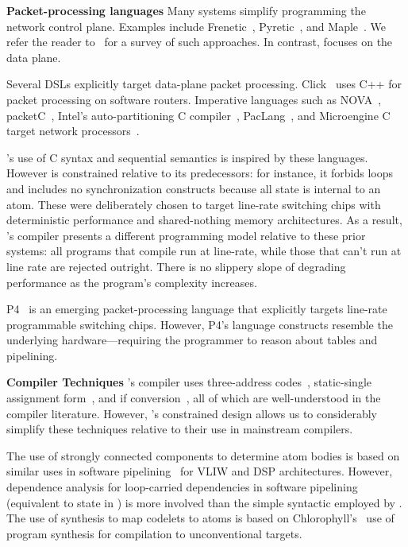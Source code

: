 \textbf{Packet-processing languages}
Many systems simplify programming the network control plane. Examples include
Frenetic~\cite{frenetic}, Pyretic~\cite{pyretic}, and Maple~\cite{maple}. We
refer the reader to~\cite{language_survey} for a survey of such approaches.  In
contrast, \pktlanguage focuses on the data plane.

Several DSLs explicitly target data-plane packet processing. Click~\cite{click}
uses C++ for packet processing on software routers. Imperative
languages such as NOVA~\cite{nova}, packetC~\cite{packetc}, Intel's
auto-partitioning C compiler~\cite{intel_uiuc_pldi}, PacLang~\cite{paclang_lang,
paclang_partitioner}, and Microengine C~\cite{microenginec, intel_ixa} target
network processors~\cite{ixp2800, ixp4xx}.

\pktlanguage's use of C syntax and sequential semantics is inspired by these
languages. However \pktlanguage is constrained relative to its predecessors:
for instance, it forbids loops and includes no synchronization constructs
because all state is internal to an atom. These were deliberately chosen to
target line-rate switching chips with deterministic performance and
shared-nothing memory architectures.  As a result, \pktlanguage's compiler
presents a different programming model relative to these prior systems: all
\pktlanguage programs that compile run at line-rate, while those that can't run
at line rate are rejected outright. There is no slippery slope of degrading
performance as the program's complexity increases.

P4~\cite{p4} is an emerging packet-processing language that explicitly targets
line-rate programmable switching chips. However, P4's language constructs
resemble the underlying hardware---requiring the programmer to reason about
tables and pipelining.

\textbf{Compiler Techniques}
\pktlanguage's compiler uses three-address codes~\cite{tac}, static-single
assignment form~\cite{ssa}, and if conversion~\cite{if_conversion}, all of
which are well-understood in the compiler literature. However, \pktlanguage's
constrained design allows us to considerably simplify these techniques relative
to their use in mainstream compilers.

The use of strongly connected components to determine atom bodies is based on
similar uses in software pipelining~\cite{software_pipelining} for VLIW and DSP
architectures. However, dependence analysis for loop-carried dependencies in
software pipelining (equivalent to state in \pktlanguage) is more involved than
the simple syntactic employed by \pktlanguage. The use of synthesis to map
codelets to atoms is based on Chlorophyll's~\cite{chlorophyll} use of program
synthesis for compilation to unconventional targets.

